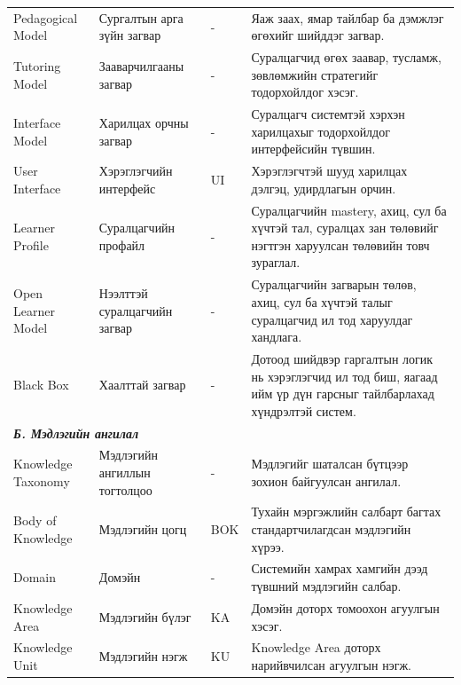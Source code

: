 {\begin{longtable}{p{} p{} p{} p{}}
Pedagogical Model & Сургалтын арга зүйн загвар & - & Яаж заах, ямар тайлбар ба дэмжлэг өгөхийг шийддэг загвар. \\

Tutoring Model & Зааварчилгааны загвар & - & Суралцагчид өгөх заавар, тусламж, зөвлөмжийн стратегийг тодорхойлдог хэсэг. \\

Interface Model & Харилцах орчны загвар & - & Суралцагч системтэй хэрхэн харилцахыг тодорхойлдог интерфейсийн түвшин. \\

User Interface & Хэрэглэгчийн интерфейс & UI & Хэрэглэгчтэй шууд харилцах дэлгэц, удирдлагын орчин. \\

Learner Profile & Суралцагчийн профайл & - & Суралцагчийн mastery, ахиц, сул ба хүчтэй тал, суралцах зан төлөвийг нэгтгэн харуулсан төлөвийн товч зураглал. \\

Open Learner Model & Нээлттэй суралцагчийн загвар & - & Суралцагчийн загварын төлөв, ахиц, сул ба хүчтэй талыг суралцагчид ил тод харуулдаг хандлага. \\

Black Box & Хаалттай загвар & - & Дотоод шийдвэр гаргалтын логик нь хэрэглэгчид ил тод биш, яагаад ийм үр дүн гарсныг тайлбарлахад хүндрэлтэй систем. \\

\midrule
\multicolumn{4}{l}{\textbf{\textit{Б. Мэдлэгийн ангилал}}} \\
\midrule

Knowledge Taxonomy & Мэдлэгийн ангиллын тогтолцоо & - & Мэдлэгийг шаталсан бүтцээр зохион байгуулсан ангилал. \\

Body of Knowledge & Мэдлэгийн цогц & BOK & Тухайн мэргэжлийн салбарт багтах стандартчилагдсан мэдлэгийн хүрээ. \\

Domain & Домэйн & - & Системийн хамрах хамгийн дээд түвшний мэдлэгийн салбар. \\

Knowledge Area & Мэдлэгийн бүлэг & KA & Домэйн доторх томоохон агуулгын хэсэг. \\

Knowledge Unit & Мэдлэгийн нэгж & KU & Knowledge Area доторх нарийвчилсан агуулгын нэгж. \\


\end{longtable}}
